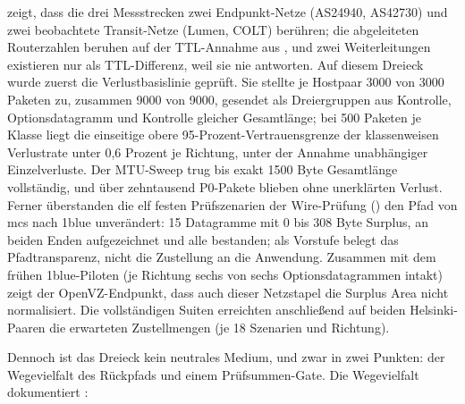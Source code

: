  zeigt, dass die drei Messstrecken zwei Endpunkt-Netze (AS24940, AS42730) und zwei
beobachtete Transit-Netze (Lumen, COLT) berühren; die abgeleiteten Routerzahlen beruhen auf der TTL-Annahme aus
, und zwei Weiterleitungen existieren nur als TTL-Differenz, weil sie nie antworten. Auf diesem Dreieck
wurde zuerst die Verlustbasislinie geprüft. Sie stellte je Hostpaar 3000 von 3000 Paketen zu, zusammen 9000 von 9000,
gesendet als Dreiergruppen aus Kontrolle, Optionsdatagramm und Kontrolle gleicher Gesamtlänge; bei 500 Paketen je Klasse
liegt die einseitige obere 95-Prozent-Vertrauensgrenze der klassenweisen Verlustrate unter 0,6 Prozent je Richtung,
unter der Annahme unabhängiger Einzelverluste. Der MTU-Sweep trug bis exakt 1500 Byte Gesamtlänge vollständig, und über
zehntausend P0-Pakete blieben ohne unerklärten Verlust. Ferner überstanden die elf festen Prüfszenarien der Wire-Prüfung
() den Pfad von mcs nach 1blue unverändert: 15 Datagramme mit 0 bis 308 Byte Surplus, an
beiden Enden aufgezeichnet und alle bestanden; als Vorstufe belegt das Pfadtransparenz, nicht die Zustellung an die
Anwendung. Zusammen mit dem frühen 1blue-Piloten (je Richtung sechs von sechs Optionsdatagrammen intakt) zeigt der
OpenVZ-Endpunkt, dass auch dieser Netzstapel die Surplus Area nicht normalisiert. Die vollständigen Suiten erreichten
anschließend auf beiden Helsinki-Paaren die erwarteten Zustellmengen (je 18 Szenarien und Richtung).

Dennoch ist das Dreieck kein neutrales Medium, und zwar in zwei Punkten: der Wegevielfalt des Rückpfads
und einem Prüfsummen-Gate. Die Wegevielfalt dokumentiert :

